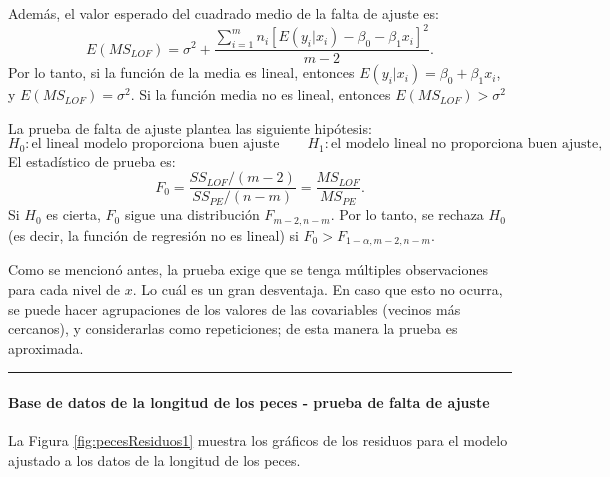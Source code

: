 \documentclass[
]{article}
\newenvironment{Shaded}{\begin{snugshade}}{\end{snugshade}}
\newcommand{\AttributeTok}[1]{\textcolor[rgb]{0.77,0.63,0.00}{#1}}
\newcommand{\DecValTok}[1]{\textcolor[rgb]{0.00,0.00,0.81}{#1}}
\newcommand{\FunctionTok}[1]{\textcolor[rgb]{0.00,0.00,0.00}{#1}}
\newcommand{\NormalTok}[1]{#1}
\newcommand{\OtherTok}[1]{\textcolor[rgb]{0.56,0.35,0.01}{#1}}
\newcommand{\SpecialCharTok}[1]{\textcolor[rgb]{0.00,0.00,0.00}{#1}}
\newcommand{\StringTok}[1]{\textcolor[rgb]{0.31,0.60,0.02}{#1}}
\begin{document}
Además, el valor esperado del cuadrado medio de la falta de ajuste es:
\[
E(MS_{LOF}) = \sigma^{2} + \frac{\sum_{i=1}^{m}n_{i}\left[ E(y_{i}|x_{i}) - \beta_{0}-\beta_{1}x_{i} \right]^{2}}{m-2}.
\]
Por lo tanto, si la función de la media es lineal, entonces \(E(y_{i}|x_{i}) = \beta_{0}+\beta_{1}x_{i}\), y \(E(MS_{LOF}) = \sigma^{2}\). Si la función media no es lineal, entonces \(E(MS_{LOF}) > \sigma^{2}\)

La prueba de falta de ajuste plantea las siguiente hipótesis:
\[
H_{0}: \mbox{el lineal modelo proporciona buen ajuste} \qquad H_{1}: \mbox{el modelo lineal no proporciona buen ajuste},
\]
El estadístico de prueba es:
\[
F_{0}=\frac{SS_{LOF}/(m-2)}{SS_{PE}/(n-m)} = \frac{MS_{LOF}}{MS_{PE}}.
\]
Si \(H_{0}\) es cierta, \(F_{0}\) sigue una distribución \(F_{m-2,n-m}\). Por lo tanto, se rechaza \(H_{0}\) (es decir, la función de regresión no es lineal) si \(F_{0} > F_{1-\alpha,m-2,n-m}\).

Como se mencionó antes, la prueba exige que se tenga múltiples observaciones para cada nivel de \(x\). Lo cuál es un gran desventaja. En caso que esto no ocurra, se puede hacer agrupaciones de los valores de las covariables (vecinos más cercanos), y considerarlas como repeticiones; de esta manera la prueba es aproximada.

\rule{\textwidth}{0.4pt}

\hypertarget{base-de-datos-de-la-longitud-de-los-peces---prueba-de-falta-de-ajuste}{%
\paragraph{Base de datos de la longitud de los peces - prueba de falta de ajuste}\label{base-de-datos-de-la-longitud-de-los-peces---prueba-de-falta-de-ajuste}}

La Figura \ref{fig:pecesResiduos1} muestra los gráficos de los residuos para el modelo ajustado a los datos de la longitud de los peces.

\begin{Shaded}
\end{Shaded}
\end{document}
